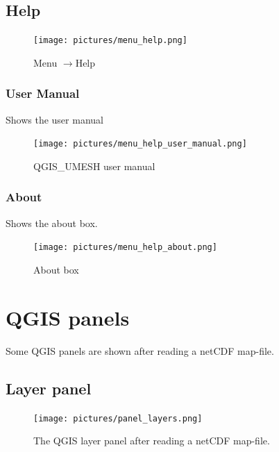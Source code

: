 \documentclass{deltares_memo}
\newcommand{\menuarrow}{$\rightarrow$}
\newcommand{\qumesh}{QGIS\_UMESH\xspace}
\newcommand{\qgis}{QGIS\xspace}
\newcommand{\netcdf}{netCDF\xspace}
\begin{document}
\subsection{Help}
\phantom{m}\vspace{-\baselineskip}
\begin{figure}[H]
    \centering    
    \texttt{[image: pictures/menu\_help.png]}
    \caption{Menu \menuarrow Help}
\end{figure}

\subsubsection{User Manual}
Shows the user manual
\begin{figure}[H]
	\centering    
	\texttt{[image: pictures/menu\_help\_user\_manual.png]}
	\caption{\qumesh user manual}
\end{figure}

\subsubsection{About}
Shows the about box.
\begin{figure}[H]
    \centering    
    \texttt{[image: pictures/menu\_help\_about.png]}
    \caption{About box}
\end{figure}
\section{QGIS panels}
Some \qgis panels are shown after reading a \netcdf map-file.
\subsection{Layer panel}
\begin{figure}[H]
	\centering    
	\texttt{[image: pictures/panel\_layers.png]}
	\caption{The \qgis layer panel after reading a \netcdf map-file.\label{fig:panel_layer}}
\end{figure}
\end{document}
